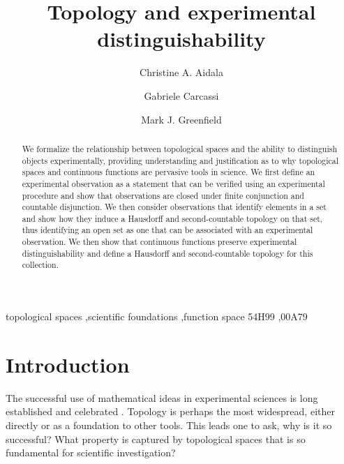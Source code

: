 \documentclass[review]{elsarticle}
\theoremstyle{plain}%
\theoremstyle{definition}
\theoremstyle{remark}
\begin{document}
\begin{frontmatter}

\title{Topology and experimental distinguishability}


\author[]{Christine A. Aidala}

\author[]{Gabriele Carcassi}

\author[]{Mark J. Greenfield}

\address{University of Michigan, Ann Arbor, MI 48109, USA}



\begin{abstract}
We formalize the relationship between topological spaces and the ability to distinguish objects experimentally, providing understanding and justification as to why topological spaces and continuous functions are pervasive tools in science. We first define an experimental observation as a statement that can be verified using an experimental procedure and show that observations are closed under finite conjunction and countable disjunction. We then consider observations that identify elements in a set and show how they induce a Hausdorff and second-countable topology on that set, thus identifying an open set as one that can be associated with an experimental observation. We then show that continuous functions preserve experimental distinguishability and define a Hausdorff and second-countable topology for this collection. 
\end{abstract}

\begin{keyword}
topological spaces \sep scientific foundations \sep function space
\MSC[2010] 54H99 \sep 00A79
\end{keyword}

\end{frontmatter}

\linenumbers

\section{Introduction}

The successful use of mathematical ideas in experimental sciences is long established and celebrated \cite{wigner}. Topology is perhaps the most widespread, either directly\cite{rashevsky, chichilnisky} or as a foundation to other tools\cite{nakahara}.  This leads one to ask, why is it so successful? What property is captured by topological spaces that is so fundamental for scientific investigation? 
\end{document}
